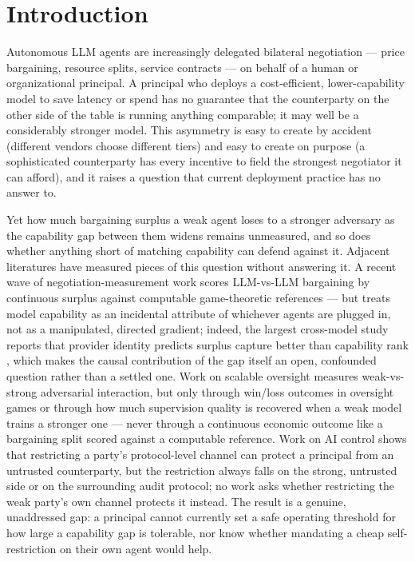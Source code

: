 \documentclass[11pt]{article}
\begin{document}
\section{Introduction}

Autonomous LLM agents are increasingly delegated bilateral negotiation --- price bargaining, resource splits, service contracts --- on behalf of a human or organizational principal. A principal who deploys a cost-efficient, lower-capability model to save latency or spend has no guarantee that the counterparty on the other side of the table is running anything comparable; it may well be a considerably stronger model. This asymmetry is easy to create by accident (different vendors choose different tiers) and easy to create on purpose (a sophisticated counterparty has every incentive to field the strongest negotiator it can afford), and it raises a question that current deployment practice has no answer to.

Yet how much bargaining surplus a weak agent loses to a stronger adversary as the capability gap between them widens remains unmeasured, and so does whether anything short of matching capability can defend against it. Adjacent literatures have measured pieces of this question without answering it. A recent wave of negotiation-measurement work scores LLM-vs-LLM bargaining by continuous surplus against computable game-theoretic references \citep{TermsBench2605,SupplyChainBargain2608,BilateralTradeEnv2604} --- but treats model capability as an incidental attribute of whichever agents are plugged in, not as a manipulated, directed gradient; indeed, the largest cross-model study reports that provider identity predicts surplus capture better than capability rank \citep{SupplyChainBargain2608}, which makes the causal contribution of the gap itself an open, confounded question rather than a settled one. Work on scalable oversight measures weak-vs-strong adversarial interaction, but only through win/loss outcomes in oversight games or through how much supervision quality is recovered when a weak model trains a stronger one --- never through a continuous economic outcome like a bargaining split scored against a computable reference. Work on AI control shows that restricting a party's protocol-level channel can protect a principal from an untrusted counterparty, but the restriction always falls on the strong, untrusted side or on the surrounding audit protocol; no work asks whether restricting the weak party's own channel protects it instead. The result is a genuine, unaddressed gap: a principal cannot currently set a safe operating threshold for how large a capability gap is tolerable, nor know whether mandating a cheap self-restriction on their own agent would help.
\end{document}
